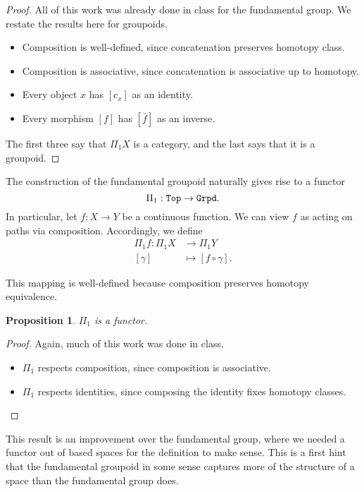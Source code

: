 \documentclass[11 pt]{amsart}
\theoremstyle{plain}   %
\newtheorem{prop}{Proposition}[section]
\theoremstyle{definition}
\theoremstyle{remark}
\numberwithin{equation}{section}
\newcommand{\cat}[1]{{\normalfont\texttt{#1}}}
\begin{document}
\begin{proof}
	All of this work was already done in class for the fundamental group. We
	restate the results here for groupoids.
	\begin{itemize}
		\item Composition is well-defined, since concatenation preserves homotopy
		      class.
		\item Composition is associative, since concatenation is associative up to
		      homotopy.
		\item Every object $x$ has $[c_x]$ as an identity.
		\item Every morphism $[f]$ has $[\bar{f}]$ as an inverse.
	\end{itemize}

	The first three say that $\Pi_1X$ is a category, and the last says that it
	is a groupoid.
\end{proof}

The construction of the fundamental groupoid naturally gives rise to a functor
$$\Pi_1: \cat{Top}\rightarrow\cat{Grpd}.$$ In particular, let $f: X\rightarrow
	Y$ be a continuous function. We can view $f$ as acting on paths via composition.
Accordingly, we define
\begin{align*}
	\Pi_1f  \colon \Pi_1X & \to \Pi_1Y              \\
	[\gamma]              & \mapsto [f\circ\gamma].
\end{align*}


This mapping is well-defined because composition preserves homotopy equivalence.


\begin{prop}\label{fundamental groupoid is a functor}
	$\Pi_1$ is a functor.
\end{prop}

\begin{proof}
	Again, much of this work was done in class.
	\begin{itemize}
		\item $\Pi_1$ respects composition, since composition is associative.
		\item $\Pi_1$ respects identities, since composing the identity fixes homotopy classes. \qedhere
	\end{itemize}
\end{proof}

This result is an improvement over the fundamental group, where we needed a
functor out of based spaces for the definition to make sense. This is a first
hint that the fundamental groupoid in some sense captures more of the structure
of a space than the fundamental group does.
\end{document}

